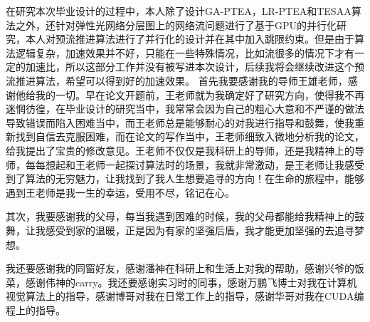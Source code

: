 \documentclass[master]{thesis-uestc}
\begin{document}
在研究本次毕业设计的过程中，本人除了设计GA-PTEA，LR-PTEA和TESAA算法之外，还针对弹性光网络分层图上的网络流问题进行了基于GPU的并行化研究，本人对预流推进算法进行了并行化的设计并在其中加入跳限约束。但是由于算法逻辑复杂，加速效果并不好，只能在一些特殊情况，比如流很多的情况下才有一定的加速比，所以这部分工作并没有被写进本次设计，后续我将会继续改进这个预流推进算法，希望可以得到好的加速效果。
\thesisacknowledgement
首先我要感谢我的导师王雄老师，感谢他给我的一切。早在论文开题前，王老师就为我确定好了研究方向，使得我不再迷惘彷徨，在毕业设计的研究当中，我常常会因为自己的粗心大意和不严谨的做法导致错误而陷入困难当中，而王老师总是能够耐心的对我进行指导和鼓舞，使我重新找到自信去克服困难，而在论文的写作当中，王老师细致入微地分析我的论文，给我提出了宝贵的修改意见。王老师不仅仅是我科研上的导师，还是我精神上的导师，每每想起和王老师一起探讨算法时的场景，我就非常激动，是王老师让我感受到了算法的无穷魅力，让我找到了我人生想要追寻的方向！在生命的旅程中，能够遇到王老师是我一生的幸运，受用不尽，铭记在心。

其次，我要感谢我的父母，每当我遇到困难的时候，我的父母都能给我精神上的鼓舞，让我感受到家的温暖，正是因为有家的坚强后盾，我才能更加坚强的去追寻梦想。

我还要感谢我的同窗好友，感谢潘神在科研上和生活上对我的帮助，感谢兴爷的饭菜，感谢伟神的carry。我还要感谢实习时的同事，感谢万鹏飞博士对我在计算机视觉算法上的指导，感谢博哥对我在日常工作上的指导，感谢华哥对我在CUDA编程上的指导。
\end{document}
